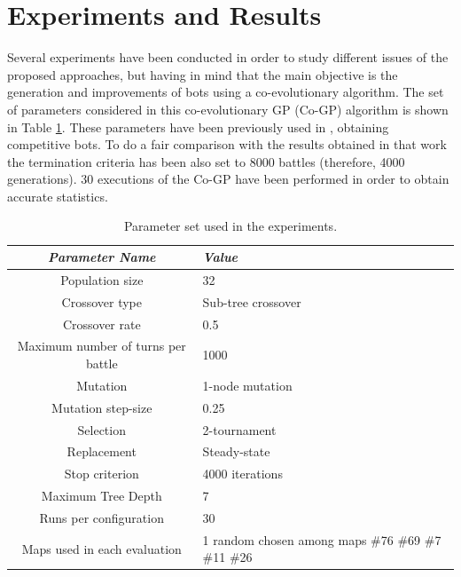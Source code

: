 \documentclass[conference]{IEEEtran}
\begin{document}


%
\section{Experiments and Results}
\label{sec:experiments}

Several experiments have been conducted in order to study different issues of the proposed approaches, but having in mind that the main objective is the generation and improvements of bots using a co-evolutionary algorithm. The set of parameters considered in this co-evolutionary GP (Co-GP) algorithm is shown in Table \ref{tab:parameters}.
These parameters have been  previously used in \cite{GarciaGP14}, obtaining competitive bots. To do a fair comparison with the results obtained in that work the termination criteria has been also set to 8000 battles (therefore, 4000 generations). 30 executions of the Co-GP have been performed in order to obtain accurate statistics.    %


\begin{table}
\begin{center}
\begin{tabular}{|c|p{2.5cm}|}
\hline
{\em Parameter Name} & {\em Value} \\\hline \hline
Population size & 32 \\\hline
Crossover type & Sub-tree crossover \\ \hline
Crossover rate & 0.5\\ \hline
Maximum number of turns per battle & 1000 \\\hline
Mutation  & 1-node mutation\\ \hline
Mutation step-size & 0.25 \\ \hline
Selection & 2-tournament \\ \hline
Replacement & Steady-state\\ \hline
Stop criterion & 4000 iterations \\ \hline
Maximum Tree Depth & 7  \\ \hline

Runs per configuration & 30 \\ \hline
Maps used in each evaluation & 1 random chosen among maps \#76 \#69 \#7 \#11 \#26\\ \hline
\end{tabular}
\caption{Parameter set used in the experiments.}     %
\label{tab:parameters}
\end{center}
\end{table}
\end{document}
